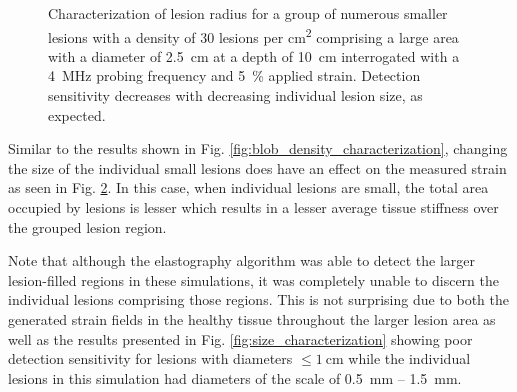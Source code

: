 \begin{figure}[!htb]
				\label{fig:blob_elastogram}
			\end{figure}

			\begin{figure}[!htb]
				\centering
				\caption[Quasi-static clustered lesion radius characterization]{Characterization of lesion radius for a group of numerous smaller lesions with a density of 30 lesions per \si{\cm\squared} comprising a large area with a diameter of \SI{2.5}{\cm} at a depth of \SI{10}{\cm} interrogated with a \SI{4}{\MHz} probing frequency and \SI{5}{\percent} applied strain. Detection sensitivity decreases with decreasing individual lesion size, as expected.}
				\label{fig:blob_radius_characterization}
			\end{figure}

			Similar to the results shown in Fig. \ref{fig:blob_density_characterization}, changing the size of the individual small lesions does have an effect on the measured strain as seen in Fig. \ref{fig:blob_radius_characterization}. In this case, when individual lesions are small, the total area occupied by lesions is lesser which results in a lesser average tissue stiffness over the grouped lesion region.

			Note that although the elastography algorithm was able to detect the larger lesion-filled regions in these simulations, it was completely unable to discern the individual lesions comprising those regions. This is not surprising due to both the generated strain fields in the healthy tissue throughout the larger lesion area as well as the results presented in Fig. \ref{fig:size_characterization} showing poor detection sensitivity for lesions with diameters $\leq \SI{1}{\cm}$ while the individual lesions in this simulation had diameters of the scale of \SI{0.5}{\mm} -- \SI{1.5}{\mm}.

